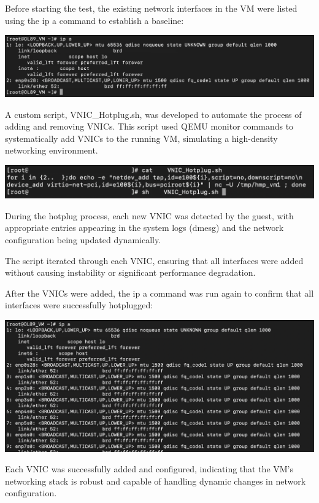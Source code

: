 Before starting the test, the existing network interfaces in the VM were listed using the ip a command to establish a baseline:
\begin{center}
    \centering
    \includegraphics[width=\textwidth]{Images/Result of ip a.png}
    \label{fig}
\end{center}

A custom script, VNIC\_Hotplug.sh, was developed to automate the process of adding and removing VNICs. This script used QEMU monitor commands to systematically add VNICs to the running VM, simulating a high-density networking environment.

\begin{center}
    \centering
    \includegraphics[width=\textwidth]{Images/24 VNIC Hotplug Script.png}
    \label{fig}
\end{center}

During the hotplug process, each new VNIC was detected by the guest, with appropriate entries appearing in the system logs (dmesg) and the network configuration being updated dynamically.\mynewline

The script iterated through each VNIC, ensuring that all interfaces were added without causing instability or significant performance degradation.\mynewline

After the VNICs were added, the ip a command was run again to confirm that all interfaces were successfully hotplugged:

\begin{center}
    \centering
    \includegraphics[width=\textwidth]{Images/VNIC result ip a (1).png}
    \label{fig}
\end{center}
\noindent
\mynewline
Each VNIC was successfully added and configured, indicating that the VM's networking stack is robust and capable of handling dynamic changes in network configuration.\mynewline

